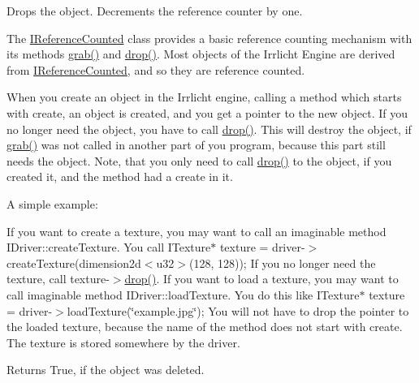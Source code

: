 Drops the object. Decrements the reference counter by one. 

The \hyperlink{classirr_1_1IReferenceCounted}{I\+Reference\+Counted} class provides a basic reference counting mechanism with its methods \hyperlink{classirr_1_1IReferenceCounted_a396f9cdbe311ada278626477b3c6f0f5}{grab()} and \hyperlink{classirr_1_1IReferenceCounted_a03856a09355b89d178090c4a5f738543}{drop()}. Most objects of the Irrlicht Engine are derived from \hyperlink{classirr_1_1IReferenceCounted}{I\+Reference\+Counted}, and so they are reference counted.

When you create an object in the Irrlicht engine, calling a method which starts with \textquotesingle{}create\textquotesingle{}, an object is created, and you get a pointer to the new object. If you no longer need the object, you have to call \hyperlink{classirr_1_1IReferenceCounted_a03856a09355b89d178090c4a5f738543}{drop()}. This will destroy the object, if \hyperlink{classirr_1_1IReferenceCounted_a396f9cdbe311ada278626477b3c6f0f5}{grab()} was not called in another part of you program, because this part still needs the object. Note, that you only need to call \hyperlink{classirr_1_1IReferenceCounted_a03856a09355b89d178090c4a5f738543}{drop()} to the object, if you created it, and the method had a \textquotesingle{}create\textquotesingle{} in it.

A simple example\+:

If you want to create a texture, you may want to call an imaginable method I\+Driver\+::create\+Texture. You call I\+Texture$\ast$ texture = driver-\/$>$create\+Texture(dimension2d$<$u32$>$(128, 128)); If you no longer need the texture, call texture-\/$>$\hyperlink{classirr_1_1IReferenceCounted_a03856a09355b89d178090c4a5f738543}{drop()}. If you want to load a texture, you may want to call imaginable method I\+Driver\+::load\+Texture. You do this like I\+Texture$\ast$ texture = driver-\/$>$load\+Texture(\char`\"{}example.\+jpg\char`\"{}); You will not have to drop the pointer to the loaded texture, because the name of the method does not start with \textquotesingle{}create\textquotesingle{}. The texture is stored somewhere by the driver. \begin{DoxyReturn}{Returns}
True, if the object was deleted. 
\end{DoxyReturn}
\mbox{\label{classirr_1_1IReferenceCounted_ad336c6e3c975e4c7911a606c27b894f0}} 
